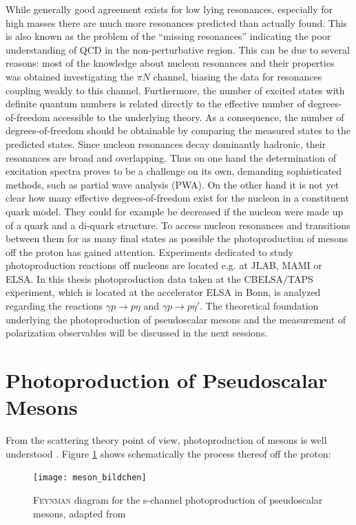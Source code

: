 While generally good agreement exists for low lying resonances, especially for high masses there are much more resonances predicted than actually found. This is also known as the problem of the \enquote{missing resonances} indicating the poor understanding of QCD in the non-perturbative region. This can be due to several reasons: most of the knowledge about nucleon resonances and their properties was obtained investigating the $\pi N$ channel, biasing the data for resonances coupling weakly to this channel. Furthermore, the number of excited states with definite quantum numbers is related directly to the effective number of degrees-of-freedom accessible to the underlying theory. As a consequence, the number of degrees-of-freedom should be obtainable by comparing the measured states to the predicted states. Since nucleon resonances decay dominantly hadronic, their resonances are broad and overlapping. Thus on one hand the determination of excitation spectra proves to be a challenge on its own, demanding sophisticated methods, such as partial wave analysis (PWA). On the other hand it is not yet clear how many effective degrees-of-freedom exist for the nucleon in a constituent quark model. They could for example be decreased if the nucleon were made up of a quark and a di-quark structure. To access nucleon resonances and transitions between them for as many final states as possible the photoproduction of mesons off the proton has gained attention. Experiments dedicated to study photoproduction reactions off nucleons are located e.g. at JLAB, MAMI or ELSA. In this thesis photoproduction data taken at the CBELSA/TAPS experiment, which is located at the accelerator ELSA in Bonn, is analyzed regarding the reactions $\gamma p \to p \eta$ and $\gamma p \to p \eta'$. The theoretical foundation underlying the photoproduction of pseudoscalar mesons and the measurement of polarization observables will be discussed in the next sessions.
\section{Photoproduction of Pseudoscalar Mesons}
From the scattering theory point of view, photoproduction of mesons is well understood \cite{Krusche}. Figure \ref{fig:mes_bildchen} shows schematically the process thereof off the proton:

\begin{figure}[htbp]
	\centering
	\texttt{[image: meson\_bildchen]}
	\caption{\textsc{Feynman} diagram for the s-channel photoproduction of pseudoscalar mesons, adapted from \cite{farahphd}}
	\label{fig:mes_bildchen}
\end{figure}

